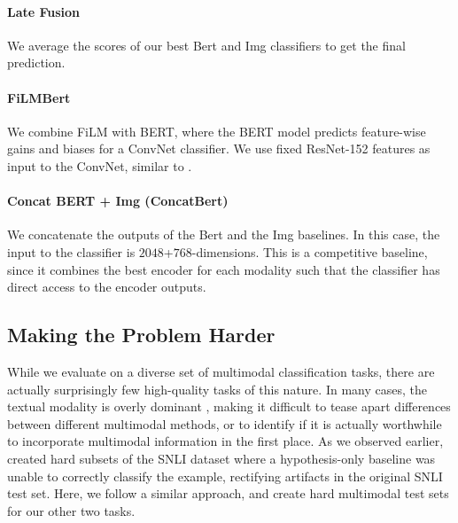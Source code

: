 \documentclass[11pt,a4paper]{article}
\begin{document}
\paragraph{Late Fusion} We average the scores of our best Bert and Img classifiers to get the final prediction.
\paragraph{FiLMBert} We combine FiLM \cite{Perez:2018film} with BERT, where the BERT model predicts feature-wise gains and biases for a ConvNet classifier. We use fixed ResNet-152 features as input to the ConvNet, similar to \citet{Perez:2018film}.
\paragraph{Concat BERT + Img (ConcatBert)} We concatenate the outputs of the Bert and the Img baselines. In this case, the input to the classifier is $2048$+$768$-dimensions. This is a competitive baseline, since it combines the best encoder for each modality such that the classifier has direct access to the encoder outputs.

\subsection{Making the Problem Harder}

While we evaluate on a diverse set of multimodal classification tasks, there are actually surprisingly few high-quality tasks of this nature. In many cases, the textual modality is overly dominant \cite[this is even a problem in VQA; see][]{Goyal:2019vqamatter}, making it difficult to tease apart differences between different multimodal methods, or to identify if it is actually worthwhile to incorporate multimodal information in the first place. As we observed earlier,  created hard subsets of the SNLI dataset where a hypothesis-only baseline was unable to correctly classify the example, rectifying artifacts in the original SNLI test set. Here, we follow a similar approach, and create hard multimodal test sets for our other two tasks.
\end{document}
